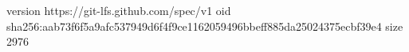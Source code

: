 version https://git-lfs.github.com/spec/v1
oid sha256:aab73f6f5a9afc537949d6f4f9ce1162059496bbeff885da25024375ecbf39e4
size 2976

